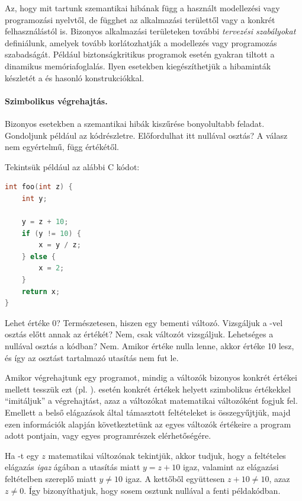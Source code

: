 Az, hogy mit tartunk szemantikai hibának függ a használt modellezési vagy programozási nyelvtől, de függhet az alkalmazási területtől vagy a konkrét felhasználástól is. Bizonyos alkalmazási területeken további \emph{tervezési szabályokat} definiálunk, amelyek tovább korlátozhatják a modellezés vagy programozás szabadságát. Például biztonságkritikus programok esetén gyakran tiltott a dinamikus memóriafoglalás. Ilyen esetekben kiegészíthetjük a hibaminták készletét a  és hasonló konstrukciókkal.

\paragraph{Szimbolikus végrehajtás.}
Bizonyos esetekben a szemantikai hibák kiszűrése bonyolultabb feladat. Gondoljunk például az  kódrészletre. Előfordulhat itt nullával osztás? A válasz nem egyértelmű, függ  értékétől.

\begin{megjegyzes}
Tekintsük például az alábbi C kódot:
\begin{lstlisting}[language=C]
int foo(int z) {
    int y;
	
    y = z + 10;
    if (y != 10) {
        x = y / z;
    } else {
        x = 2;
    }
    return x;
}
\end{lstlisting}

Lehet  értéke 0? Természetesen, hiszen  egy bementi változó. Vizsgáljuk a -vel osztás előtt annak az értékét? Nem, csak  változót vizsgáljuk. Lehetséges a nullával osztás a kódban? Nem. Amikor  értéke nulla lenne, akkor  értéke 10 lesz, és így az osztást tartalmazó utasítás nem fut le.
\end{megjegyzes}

Amikor végrehajtunk egy programot, mindig a változók bizonyos konkrét értékei mellett tesszük ezt (pl. ).  esetén konkrét értékek helyett szimbolikus értékekkel ``imitáljuk'' a végrehajtást, azaz a változókat matematikai változóként fogjuk fel. Emellett a belső elágazások által támasztott feltételeket is összegyűjtjük, majd ezen információk alapján következtetünk az egyes változók értékeire a program adott pontjain, vagy egyes programrészek elérhetőségére.

\begin{megjegyzes}
Ha -t egy $z$ matematikai változónak tekintjük, akkor tudjuk, hogy a feltételes elágazás \emph{igaz} ágában a  utasítás miatt $y = z + 10$ igaz, valamint az elágazási feltételben szereplő  miatt $y \neq 10$ igaz. A kettőből együttesen $z + 10 \neq 10$, azaz $z \neq 0$. Így bizonyíthatjuk, hogy sosem osztunk nullával a fenti példakódban.
\end{megjegyzes}

